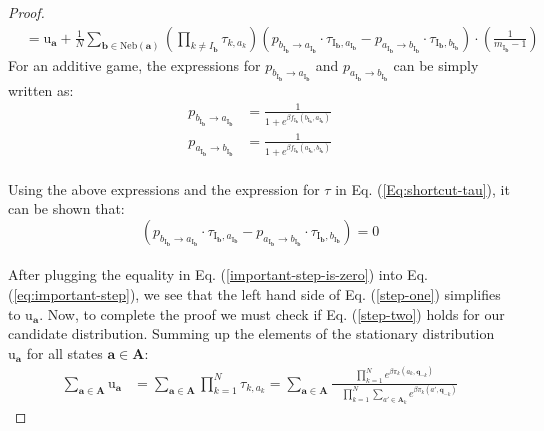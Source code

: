 \documentclass[11pt]{article}
\theoremstyle{plainCl1}
\theoremstyle{plainCl2}
\newcommand{\A}{\mathbf{A}}
\newcommand{\abf}{\mathbf{a}}
\newcommand{\bbf}{\mathbf{b}}
\newcommand{\qbf}{\mathbf{q}}
\begin{document}
\begin{proof}
\begin{align}
\label{eq:important-step}
&= \mathrm{u}_\abf +  \frac{1}{N} \sum_{\bbf \in \mathrm{Neb}(\abf)} \left( \prod_{k \neq I_\bbf} \tau_{k,a_k} \right) \left( p_{b_{\mathrm{I}_\bbf} \to a_{\mathrm{I}_\bbf}} \cdot \tau_{\mathrm{I}_\bbf, a_{\mathrm{I}_\bbf}} -  p_{a_{\mathrm{I}_\bbf} \to b_{\mathrm{I}_\bbf}} \cdot \tau_{\mathrm{I}_\bbf, b_{\mathrm{I}_\bbf}} \right) \cdot \left(  \frac{1}{m_{\mathrm{I}_\bbf}-1} \right)
\end{align}
\noindent For an additive game, the expressions for $p_{b_{\mathrm{I}_\bbf} \to a_{\mathrm{I}_\bbf}}$ and $p_{a_{\mathrm{I}_\bbf} \to b_{\mathrm{I}_\bbf}}$ can be simply written as: 
\begin{align}
p_{b_{\mathrm{I}_\bbf} \to a_{\mathrm{I}_\bbf}} &=\frac{1}{1 + \displaystyle e^{\beta f_{\mathrm{I}_\bbf}(b_{\mathrm{I}_\bbf}, a_{\mathrm{I}_\bbf})}} \\[10pt] 
p_{a_{\mathrm{I}_\bbf} \to b_{\mathrm{I}_\bbf}} &= \frac{1}{1 + \displaystyle e^{\beta f_{\mathrm{I}_\bbf}(a_{\mathrm{I}_\bbf}, b_{\mathrm{I}_\bbf})}} 
\end{align} \\
Using the above expressions and the expression for $\tau$ in Eq. (\ref{Eq:shortcut-tau}), it can be shown that: 
\begin{equation}
 \left( p_{b_{\mathrm{I}_\bbf} \to a_{\mathrm{I}_\bbf}} \cdot \tau_{\mathrm{I}_\bbf, a_{\mathrm{I}_\bbf}} -  p_{a_{\mathrm{I}_\bbf} \to b_{\mathrm{I}_\bbf}} \cdot \tau_{\mathrm{I}_\bbf, b_{\mathrm{I}_\bbf}} \right) = 0
\label{important-step-is-zero}
\end{equation}
\\ \noindent After plugging the equality in Eq. (\ref{important-step-is-zero}) into Eq. (\ref{eq:important-step}), we see that the left hand side of Eq. (\ref{step-one}) simplifies to $\mathrm{u}_{\abf}$. Now, to complete the proof we must check if Eq. (\ref{step-two}) holds for our candidate distribution. Summing up the elements of the stationary distribution $\mathrm{u}_\abf$ for all states $\abf \in \A$: \\ 
\begin{align}
\sum_{\abf \in \A} \mathrm{u}_\abf &= \sum_{\abf \in \A} \prod_{k=1}^N \tau_{k,a_k} = \sum_{\abf \in \A} \frac{\displaystyle \prod_{k=1}^N e^{\beta \pi_k(a_k, \qbf_{-k})}}{\displaystyle \quad \prod_{k=1}^N \sum_{a' \in \A_k} e^{\beta \pi_k(a',\qbf_{-k})}}
\end{align}

\end{proof}
\end{document}
